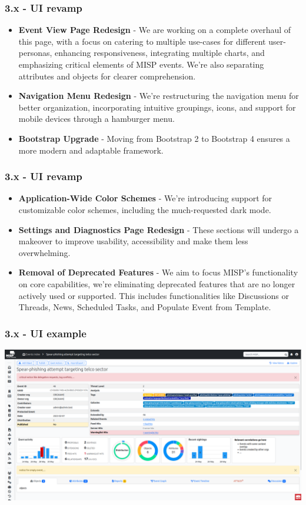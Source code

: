 \begin{frame}
        \frametitle{3.x - UI revamp}
	\begin{itemize}
	    \item {\bf Event View Page Redesign} - We are working on a complete overhaul of this page, with a focus on catering to multiple use-cases for different user-personas, enhancing responsiveness, integrating multiple charts, and emphasizing critical elements of MISP events. We’re also separating attributes and objects for clearer comprehension.
	    \item {\bf Navigation Menu Redesign} - We’re restructuring the navigation menu for better organization, incorporating intuitive groupings, icons, and support for mobile devices through a hamburger menu.
	    \item {\bf Bootstrap Upgrade} - Moving from Bootstrap 2 to Bootstrap 4 ensures a more modern and adaptable framework.
	\end{itemize}
\end{frame}

\begin{frame}
        \frametitle{3.x - UI revamp}
	\begin{itemize}
		\item {\bf Application-Wide Color Schemes} - We’re introducing support for customizable color schemes, including the much-requested dark mode.
		\item {\bf Settings and Diagnostics Page Redesign} - These sections will undergo a makeover to improve usability, accessibility and make them less overwhelming.
		\item {\bf Removal of Deprecated Features} - We aim to focus MISP’s functionality on core capabilities, we’re eliminating deprecated features that are no longer actively used or supported. This includes functionalities like Discussions or Threads, News, Scheduled Tasks, and Populate Event from Template.
	\end{itemize}
\end{frame}

\begin{frame}
        \frametitle{3.x - UI example}
	\begin{center}
		\includegraphics[scale=0.15]{misp3-ui.png}
	\end{center}
\end{frame}



